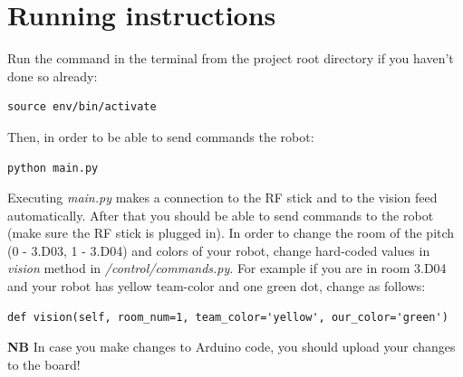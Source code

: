 \documentclass[12pt]{article}
\begin{document}
\section{Running instructions}

Run the command in the terminal from the project root directory if you haven't done so already:
\begin{lstlisting}
source env/bin/activate
\end{lstlisting}
Then, in order to be able to send commands the robot:
\begin{lstlisting}
python main.py
\end{lstlisting}
Executing \textit{main.py} makes a connection to the RF stick and to the vision feed automatically. After that you should be able to send commands to the robot (make sure the RF stick is plugged in).
In order to change the room of the pitch (0 - 3.D03, 1 - 3.D04) and colors of your robot, change hard-coded values in \textit{vision} method in \textit{/control/commands.py}. For example if you are in room 3.D04 and your robot has yellow team-color and one green dot, change as follows:
\begin{lstlisting}
def vision(self, room_num=1, team_color='yellow', our_color='green')
\end{lstlisting}
\bigskip

\textbf{NB} In case you make changes to Arduino code, you should upload your changes to the board!
\bigskip
\end{document}
